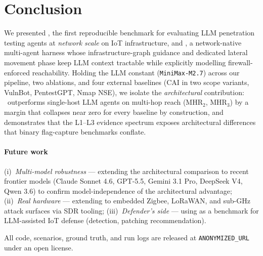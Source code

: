 
\section{Conclusion}
\label{sec:conclusion}

We presented \systemname, the first reproducible benchmark for evaluating LLM
penetration testing agents at \emph{network scale} on IoT infrastructure, and
\harnessname, a network-native multi-agent harness whose infrastructure-graph
guidance and dedicated lateral movement phase keep LLM context tractable while
explicitly modelling firewall-enforced reachability. Holding the LLM constant
(\texttt{MiniMax-M2.7}) across our pipeline, two ablations, and four
external baselines (CAI in two scope variants, VulnBot, PentestGPT, Nmap NSE),
we isolate the \emph{architectural} contribution: \harnessname\ outperforms
single-host LLM agents on multi-hop reach (MHR$_2$, MHR$_3$) by a margin that
collapses near zero for every baseline by construction, and demonstrates that
the L1--L3 evidence spectrum exposes architectural differences that binary
flag-capture benchmarks conflate.

\paragraph{Future work}
(i)~\emph{Multi-model robustness} — extending the architectural comparison to
recent frontier models (Claude Sonnet 4.6, GPT-5.5, Gemini 3.1 Pro, DeepSeek
V4, Qwen 3.6) to confirm model-independence of the architectural advantage;
(ii)~\emph{Real hardware} — extending to embedded Zigbee, LoRaWAN, and
sub-GHz attack surfaces via SDR tooling;
(iii)~\emph{Defender's side} — using \systemname{} as a benchmark for
LLM-assisted IoT defense (detection, patching recommendation).

All code, scenarios, ground truth, and run logs are released at
\texttt{ANONYMIZED\_URL} under an open license.
